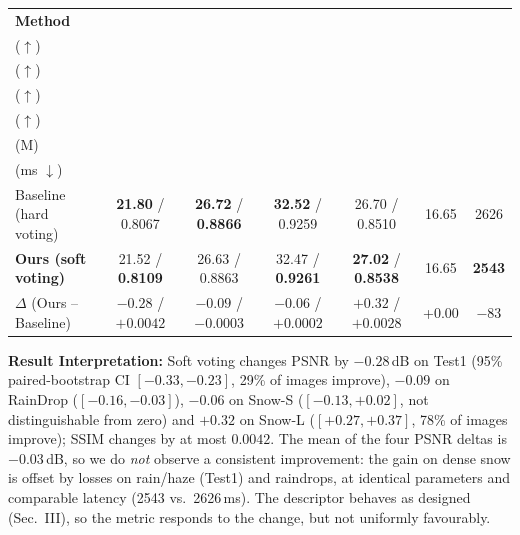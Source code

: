 \documentclass[8pt,a4paper]{article}
\begin{document}
\begin{center}


\label{tab:results}

\small

\begin{tabularx}{\linewidth}{
    @{}X c c c c c c@{}
}

\toprule

\textbf{Method}
&
\makecell{\textbf{Test1}\\($\uparrow$)}
&
\makecell{\textbf{RainDrop}\\($\uparrow$)}
&
\makecell{\textbf{Snow-S}\\($\uparrow$)}
&
\makecell{\textbf{Snow-L}\\($\uparrow$)}
&
\makecell{\textbf{Params}\\(M)}
&
\makecell{\textbf{Latency}\\(ms $\downarrow$)}
\\

\midrule

Baseline (hard voting)
&
\textbf{21.80} / 0.8067
&
\textbf{26.72} / \textbf{0.8866}
&
\textbf{32.52} / 0.9259
&
26.70 / 0.8510
&
16.65
&
2626
\\

\textbf{Ours (soft voting)}
&
21.52 / \textbf{0.8109}
&
26.63 / 0.8863
&
32.47 / \textbf{0.9261}
&
\textbf{27.02} / \textbf{0.8538}
&
16.65
&
\textbf{2543}
\\

\midrule

$\Delta$ (Ours -- Baseline)
&
$-0.28$ / $+0.0042$
&
$-0.09$ / $-0.0003$
&
$-0.06$ / $+0.0002$
&
$+0.32$ / $+0.0028$
&
+0.00
&
$-83$
\\

\bottomrule

\end{tabularx}

\end{center}

\vspace{-5pt}

\textbf{Result Interpretation:}
Soft voting changes PSNR by $-0.28$\,dB on Test1 (95\% paired-bootstrap CI $[-0.33,-0.23]$, 29\% of images improve), $-0.09$ on RainDrop ($[-0.16,-0.03]$), $-0.06$ on Snow-S ($[-0.13,+0.02]$, not distinguishable from zero) and $+0.32$ on Snow-L ($[+0.27,+0.37]$, 78\% of images improve); SSIM changes by at most $0.0042$. The mean of the four PSNR deltas is $-0.03$\,dB, so we do \emph{not} observe a consistent improvement: the gain on dense snow is offset by losses on rain/haze (Test1) and raindrops, at identical parameters and comparable latency (2543 vs.\ 2626\,ms). The descriptor behaves as designed (Sec.~III), so the metric responds to the change, but not uniformly favourably.
\end{document}
